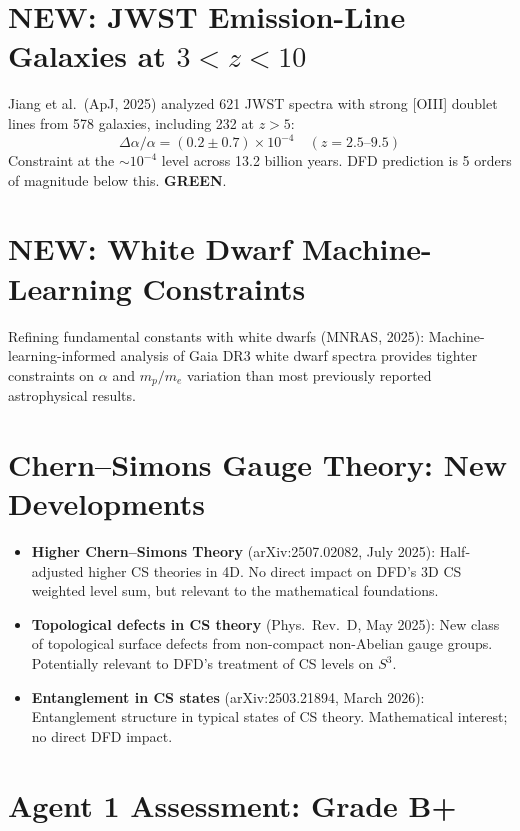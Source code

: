 \documentclass[11pt,a4paper]{article}
\newcommand{\GREEN}{\textcolor{dfdgreen}{\textbf{GREEN}}}
\newcommand{\NEW}{\textcolor{dfdblue}{\textbf{NEW}}}
\begin{document}
\section{\NEW: JWST Emission-Line Galaxies at $3 < z < 10$}

Jiang et al.\ (ApJ, 2025) analyzed 621 JWST spectra with strong [OIII] doublet lines from 578 galaxies, including 232 at $z > 5$:
\begin{equation}
\Delta\alpha/\alpha = (0.2 \pm 0.7) \times 10^{-4} \quad (z = 2.5\text{--}9.5)
\end{equation}
Constraint at the $\sim 10^{-4}$ level across 13.2 billion years. DFD prediction is 5 orders of magnitude below this. \GREEN.

\section{\NEW: White Dwarf Machine-Learning Constraints}

Refining fundamental constants with white dwarfs (MNRAS, 2025): Machine-learning-informed analysis of Gaia DR3 white dwarf spectra provides tighter constraints on $\alpha$ and $m_p/m_e$ variation than most previously reported astrophysical results.

\section{Chern--Simons Gauge Theory: New Developments}

\begin{itemize}
\item \textbf{Higher Chern--Simons Theory} (arXiv:2507.02082, July 2025): Half-adjusted higher CS theories in 4D. No direct impact on DFD's 3D CS weighted level sum, but relevant to the mathematical foundations.
\item \textbf{Topological defects in CS theory} (Phys.\ Rev.\ D, May 2025): New class of topological surface defects from non-compact non-Abelian gauge groups. Potentially relevant to DFD's treatment of CS levels on $S^3$.
\item \textbf{Entanglement in CS states} (arXiv:2503.21894, March 2026): Entanglement structure in typical states of CS theory. Mathematical interest; no direct DFD impact.
\end{itemize}

\section{Agent 1 Assessment: Grade B+}
\end{document}
